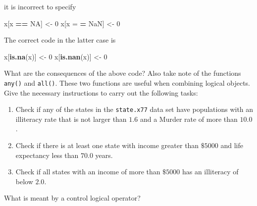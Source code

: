 \documentclass[
]{book}
\newenvironment{Shaded}{\begin{snugshade}}{\end{snugshade}}
\newcommand{\ConstantTok}[1]{\textcolor[rgb]{0.56,0.35,0.01}{#1}}
\newcommand{\DecValTok}[1]{\textcolor[rgb]{0.00,0.00,0.81}{#1}}
\newcommand{\ErrorTok}[1]{\textcolor[rgb]{0.64,0.00,0.00}{\textbf{#1}}}
\newcommand{\FunctionTok}[1]{\textcolor[rgb]{0.13,0.29,0.53}{\textbf{#1}}}
\newcommand{\NormalTok}[1]{#1}
\newcommand{\OtherTok}[1]{\textcolor[rgb]{0.56,0.35,0.01}{#1}}
\newcommand{\SpecialCharTok}[1]{\textcolor[rgb]{0.81,0.36,0.00}{\textbf{#1}}}
\providecommand{\tightlist}{%
  \setlength{\itemsep}{0pt}\setlength{\parskip}{0pt}}
\begin{document}
it is incorrect to specify

\begin{Shaded}
\begin{Highlighting}[]
\NormalTok{x[x }\SpecialCharTok{==} \ConstantTok{NA}\NormalTok{] }\OtherTok{\textless{}{-}} \DecValTok{0}
\NormalTok{x[x }\OtherTok{=} \ErrorTok{=} \ConstantTok{NaN}\NormalTok{] }\OtherTok{\textless{}{-}} \DecValTok{0} 
\end{Highlighting}
\end{Shaded}

The correct code in the latter case is

\begin{Shaded}
\begin{Highlighting}[]
\NormalTok{x[}\FunctionTok{is.na}\NormalTok{(x)] }\OtherTok{\textless{}{-}} \DecValTok{0}
\NormalTok{x[}\FunctionTok{is.nan}\NormalTok{(x)] }\OtherTok{\textless{}{-}} \DecValTok{0}
\end{Highlighting}
\end{Shaded}

What are the consequences of the above code? Also take note of the functions \texttt{any()} and \texttt{all()}. These two functions are useful when combining logical objects. Give the necessary instructions to carry out the following tasks:

\begin{enumerate}
\def\labelenumi{(\alph{enumi})}
\tightlist
\item
  Check if any of the states in the \texttt{state.x77} data set have populations with an illiteracy rate that is not larger than \(1.6\) and a Murder rate of more than \(10.0\).
\item
  Check if there is at least one state with income greater than \(\$5000\) and life expectancy less than \(70.0\) years.
\item
  Check if all states with an income of more than \(\$5000\) has an illiteracy of below \(2.0\).
\end{enumerate}

What is meant by a control logical operator?
\end{document}
